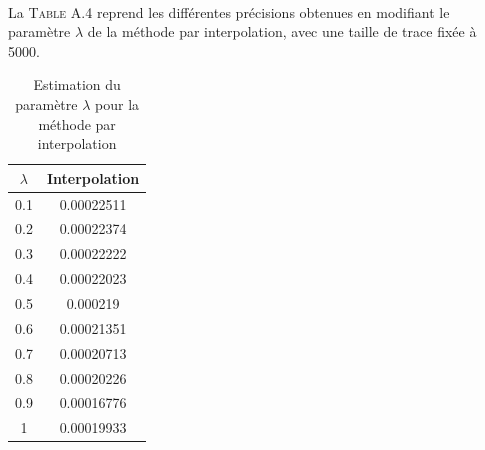 \documentclass[a4paper,titlepage]{report}
\begin{document}
\paragraph{}
La \textsc{Table A.4} reprend les différentes précisions obtenues en modifiant le paramètre $\lambda$ de la méthode par interpolation, avec une taille de trace fixée à 5000.

\begin{table}[h]
	\center
	\begin{tabular}{c|c}
		$\lambda$ & Interpolation\\
		\hline
		0.1 & \num{0.00022511}\\
		0.2 & \num{0.00022374}\\
		0.3 & \num{0.00022222}\\
		0.4 & \num{0.00022023}\\
		0.5 & \num{0.000219}\\
		0.6 & \num{0.00021351}\\
		0.7 & \num{0.00020713}\\
		0.8 & \num{0.00020226}\\
		0.9 & \num{0.00016776}\\
		1 & \num{0.00019933}
	\end{tabular}
	\caption{Estimation du paramètre $\lambda$ pour la méthode par interpolation}
\end{table}
\end{document}
